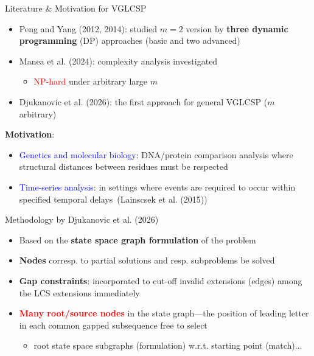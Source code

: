 \documentclass{beamer}
\begin{document}
\begin{frame}{Literature \& Motivation for VGLCSP}
   
   \begin{itemize}
       \item  Peng and Yang (2012, 2014): studied  $m=2$  version by \textbf{three dynamic programming} (DP) approaches (basic and two advanced)
       \item  Manea et al. (2024): complexity analysis investigated
       \begin{itemize}
       	\item   \textcolor{red}{NP-hard}  under arbitrary large $m$ 
        \end{itemize} 
        \item Djukanovic et al. (2026): the first approach for general VGLCSP ($m$ arbitrary)
   \end{itemize} \vspace{0.5cm}
   
   \textbf{Motivation}:
   \begin{itemize}
       \item  \textcolor{blue}{Genetics and molecular biology}: DNA/protein comparison analysis where structural distances between residues must be respected \vspace{0.2cm}
       \item \textcolor{blue}{Time-series analysis}: in settings where events are required to occur within specified temporal delays~(Lainscsek et al. (2015))

   \end{itemize}
   
\end{frame}

\begin{frame}{Methodology by Djukanovic et al. (2026) }
	
	
    \begin{itemize}
        \item Based on the \textbf{state space graph formulation} of the problem \vspace{0.3cm}
        \item \textbf{Nodes} corresp. to partial solutions and resp. subproblems be solved \vspace{0.3cm}
        \item \textbf{Gap constraints}: incorporated to cut-off invalid extensions (edges) among the LCS extensions immediately \vspace{0.3cm}
        \item \textcolor{red}{\textbf{Many root/source nodes}} in the state graph---the position of leading letter in each common gapped subsequence free to select 
        \begin{itemize}
        	\item   root state space subgraphs (formulation) w.r.t. starting point (match)...
        \end{itemize} 
    \end{itemize}
    
\end{frame}
\end{document}
